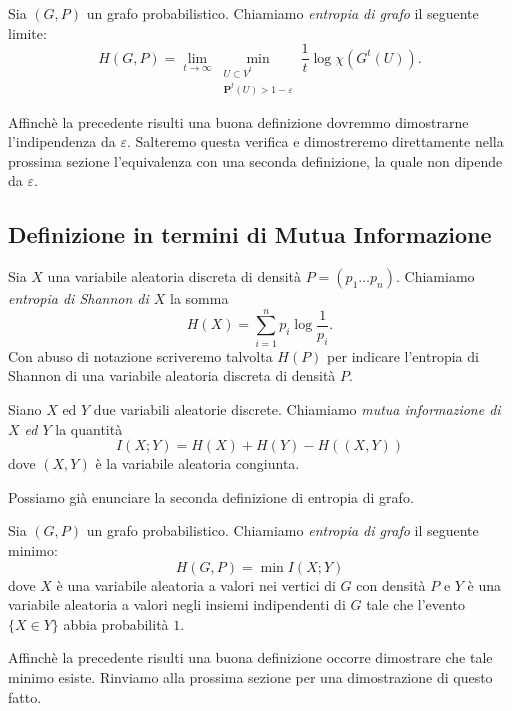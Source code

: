 \begin{definition}
	Sia \((G,P)\) un grafo probabilistico. Chiamiamo \emph{entropia di grafo} il seguente limite: 
	\begin{equation}
		\label{eq:entropyone} H(G,P)=\lim_{t\to \infty} \min_{\substack{ U\subset V^t\\\mathbf{P}^t(U)>1-\varepsilon}} \frac{1}{t}\log{\chi(G^t(U))}. 
	\end{equation}
\end{definition}

Affinchè la precedente risulti una buona definizione dovremmo dimostrarne l'indipendenza da \(\varepsilon\). Salteremo questa verifica e dimostreremo direttamente nella prossima sezione l'equivalenza con una seconda definizione, la quale non dipende da \(\varepsilon\).

\subsection{Definizione in termini di Mutua Informazione} 
\begin{definition}
	Sia \(X\) una variabile aleatoria discreta di densità \(P=(p_1\dots p_n)\). Chiamiamo \emph{entropia di Shannon di \(X\)} la somma
	\[H(X)=\sum_{i=1}^n p_i \log{\frac{1}{p_i}}.\]
	Con abuso di notazione scriveremo talvolta \(H(P)\) per indicare l'entropia di Shannon di una variabile aleatoria discreta di densit\`a \(P\). 
\end{definition}
\begin{definition}
	Siano \(X\) ed \(Y\) due variabili aleatorie discrete. Chiamiamo \emph{mutua informazione di \(X\) ed \(Y\)} la quantità
	\[I(X;Y)=H(X)+H(Y)-H((X,Y))\]
	dove \((X,Y)\) è la variabile aleatoria congiunta. 
\end{definition}

Possiamo già enunciare la seconda definizione di entropia di grafo. 
\begin{definition}
	Sia \((G,P)\) un grafo probabilistico. Chiamiamo \emph{entropia di grafo} il seguente minimo: 
	\begin{equation}
		\label{eq:entropytwo} H(G,P)=\min I(X;Y) 
	\end{equation}
	dove \(X\) è una variabile aleatoria a valori nei vertici di \(G\) con densità \(P\) e \(Y\) è una variabile aleatoria a valori negli insiemi indipendenti di \(G\) tale che l'evento \(\{X\in Y\}\) abbia probabilità \(1\). 
\end{definition}

Affinchè la precedente risulti una buona definizione occorre dimostrare che tale minimo esiste. Rinviamo alla prossima sezione per una dimostrazione di questo fatto.


